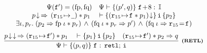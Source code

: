 \begin{figure*}[!thp]
{\begin{minipage}{1\linewidth}
\[{\begin{array}{c}
						\Psi (\lab{}') = (\specpre, \specpost) \quad
						\wfcblk{\astP'}{\astQ}{\lab{}\!+\!8}{\cblk} \\
						\nxtAst{\astP} \,\Rightarrow\,
                             (\regst{\reg{15}}{\notCare})
                                 * \astP_1
						\quad
						\wfins{\asrttm{(\regst{\reg{15}}{\lab{}} * \astP_1)}}
						{\simplins}{\astP_2}  \\
						\exists  \lgvl, \pr. \;
						\supimpl{\astP_2}{\astP'}{\specpre \; \lgvl * \pr}{\specpost \; \lgvl * \pr} \, \wedge \,
						(\specpost \; \lgvl \Rightarrow \reg{15} \!=\! \lab{})
					\end{array}	
				}
			\]
%
%
%
			\[
				\infer[\tinybftext{(RETL)}]
				{
					\wfcblk{\astP}{\astQ}{\lab{}}{\retl; \, \simplins}
				}
				{
                    \nxtAst{\nxtAst{\astP}} \,\Rightarrow
                      (\regst\RAreg{\lab{}'}) * \astP_1
                      \quad
                    \wfins{\astP_1}{\simplins}{\astP_2}
                    \quad
					(\regst\RAreg{\lab{}'}) * \astP_2 \Rightarrow \astQ
				}
			\]
%
%
%

\end{minipage}}
\end{figure*}
